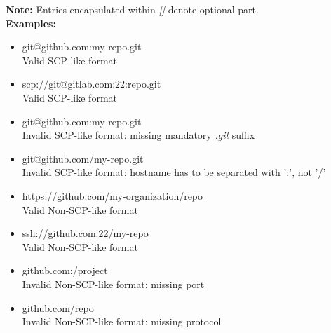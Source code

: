 \documentclass[../main.tex]{subfiles}
\begin{document}
\textbf{Note:} Entries encapsulated within \textit{[]} denote optional part.\\

\textbf{Examples:}
\begin{itemize}
    \item git@github.com:my-repo.git\\
    Valid SCP-like format

    \item scp://git@gitlab.com:22:repo.git\\
    Valid SCP-like format

    \item git@github.com:my-repo.git\\
    Invalid SCP-like format: missing mandatory \textit{.git} suffix

    \item git@github.com/my-repo.git\\
    Invalid SCP-like format: hostname has to be separated with ':', not '/'

    \item https://github.com/my-organization/repo\\
    Valid Non-SCP-like format
    
    \item ssh://github.com:22/my-repo\\
    Valid Non-SCP-like format

    \item github.com:/project\\
    Invalid Non-SCP-like format: missing port

    \item github.com/repo\\
    Invalid Non-SCP-like format: missing protocol
\end{itemize}
\end{document}
